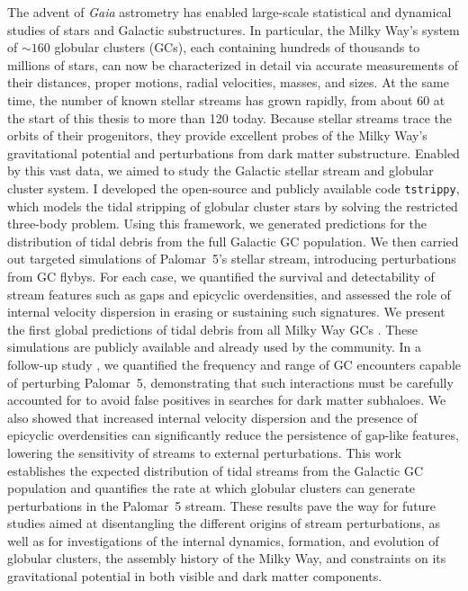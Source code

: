 The advent of \textit{Gaia} astrometry has enabled large-scale statistical and dynamical studies of stars and Galactic substructures. In particular, the Milky Way's system of $\sim 160$ globular clusters (GCs), each containing hundreds of thousands to millions of stars, can now be characterized in detail via accurate measurements of their distances, proper motions, radial velocities, masses, and sizes. At the same time, the number of known stellar streams has grown rapidly, from about 60 at the start of this thesis to more than 120 today. Because stellar streams trace the orbits of their progenitors, they provide excellent probes of the Milky Way's gravitational potential and perturbations from dark matter substructure. Enabled by this vast data, we aimed to study the Galactic stellar stream and globular cluster system. I developed the open-source and publicly available code \texttt{tstrippy}, which models the tidal stripping of globular cluster stars by solving the restricted three-body problem. Using this framework, we generated predictions for the distribution of tidal debris from the full Galactic GC population. We then carried out targeted simulations of Palomar~5's stellar stream, introducing perturbations from GC flybys. For each case, we quantified the survival and detectability of stream features such as gaps and epicyclic overdensities, and assessed the role of internal velocity dispersion in erasing or sustaining such signatures. We present the first global predictions of tidal debris from all Milky Way GCs \citep{2023A&A...673A..44F}. These simulations are publicly available and already used by the community. In a follow-up study \citep{2025A&A...699A.289F}, we quantified the frequency and range of GC encounters capable of perturbing Palomar~5, demonstrating that such interactions must be carefully accounted for to avoid false positives in searches for dark matter subhaloes. We also showed that increased internal velocity dispersion and the presence of epicyclic overdensities can significantly reduce the persistence of gap-like features, lowering the sensitivity of streams to external perturbations. This work establishes the expected distribution of tidal streams from the Galactic GC population and quantifies the rate at which globular clusters can generate perturbations in the Palomar~5 stream. These results pave the way for future studies aimed at disentangling the different origins of stream perturbations, as well as for investigations of the internal dynamics, formation, and evolution of globular clusters, the assembly history of the Milky Way, and constraints on its gravitational potential in both visible and dark matter components.



